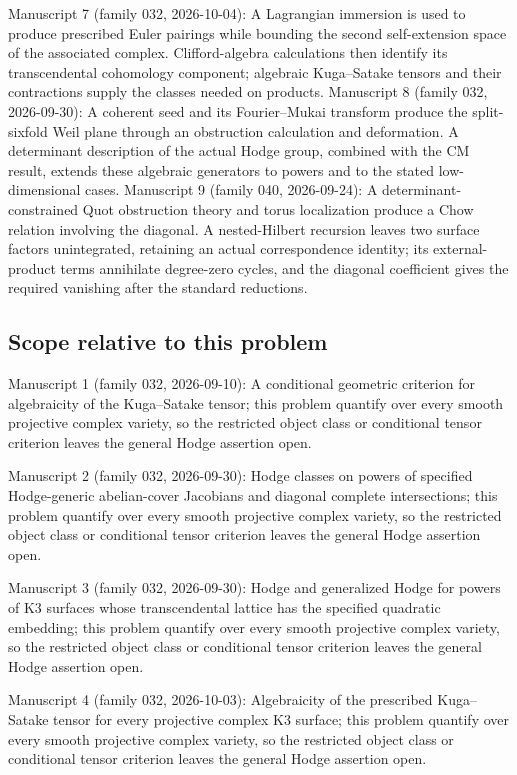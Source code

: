\documentclass[11pt]{article}
\begin{document}
Manuscript 7 (family 032, 2026-10-04): A Lagrangian immersion is used to produce prescribed Euler pairings while bounding the second self-extension space of the associated complex. Clifford-algebra calculations then identify its transcendental cohomology component; algebraic Kuga--Satake tensors and their contractions supply the classes needed on products. Manuscript 8 (family 032, 2026-09-30): A coherent seed and its Fourier--Mukai transform produce the split-sixfold Weil plane through an obstruction calculation and deformation. A determinant description of the actual Hodge group, combined with the CM result, extends these algebraic generators to powers and to the stated low-dimensional cases. Manuscript 9 (family 040, 2026-09-24): A determinant-constrained Quot obstruction theory and torus localization produce a Chow relation involving the diagonal. A nested-Hilbert recursion leaves two surface factors unintegrated, retaining an actual correspondence identity; its external-product terms annihilate degree-zero cycles, and the diagonal coefficient gives the required vanishing after the standard reductions.

\subsection{Scope relative to this problem}
Manuscript 1 (family 032, 2026-09-10): A conditional geometric criterion for algebraicity of the Kuga–Satake tensor; this problem quantify over every smooth projective complex variety, so the restricted object class or conditional tensor criterion leaves the general Hodge assertion open.

Manuscript 2 (family 032, 2026-09-30): Hodge classes on powers of specified Hodge-generic abelian-cover Jacobians and diagonal complete intersections; this problem quantify over every smooth projective complex variety, so the restricted object class or conditional tensor criterion leaves the general Hodge assertion open.

Manuscript 3 (family 032, 2026-09-30): Hodge and generalized Hodge for powers of K3 surfaces whose transcendental lattice has the specified quadratic embedding; this problem quantify over every smooth projective complex variety, so the restricted object class or conditional tensor criterion leaves the general Hodge assertion open.

Manuscript 4 (family 032, 2026-10-03): Algebraicity of the prescribed Kuga–Satake tensor for every projective complex K3 surface; this problem quantify over every smooth projective complex variety, so the restricted object class or conditional tensor criterion leaves the general Hodge assertion open.
\end{document}
